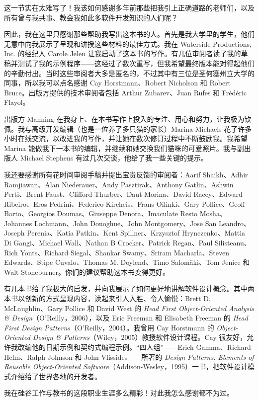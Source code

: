这一节实在太难写了！我该如何感谢多年前那些把我引上正确道路的老师们，以及所有曾与我共事、教会我如此多软件开发知识的人们呢？

因此，我在这里只感谢那些帮助我写出这本书的人。首先是我大学里的学生，他们无意中向我展示了呈现和讲授这些材料的最佳方式。我在 Waterside Productions, Inc. 的经纪人 Carole Jelen 让我启动了这本书的写作。有几位审阅者读了我的草稿并测试了我的示例程序——这经过了数次重写，但我希望最终版本能对得起他们的辛勤付出。当时这些审阅者大多是匿名的，不过其中有三位是圣何塞州立大学的同事，所以我可以点名感谢 Cay Horstmann、Robert Nicholson 和 Robert Bruce。出版方提供的技术审阅者包括 Arthur Zubarev、Juan Rufes 和 Frédéric Flayol。

出版方 Manning 在我身上、在本书写作上投入的专注、用心和努力，让我极为钦佩。我与高级开发编辑（也是一位养了多只猫的家长）Marina Michaels 花了许多小时在线交流，以改进我的写作，并让她在数次修订过程中不断鼓励我。我希望 Marina 能做我下一本书的编辑，并继续和她交换我们猫咪的可爱照片。我与副出版人 Michael Stephens 有过几次交谈，他给了我一些关键的提示。

我还要感谢所有花时间审阅手稿并提出宝贵反馈的审阅者：Aarif Shaikh、Adhir Ramjiawan、Alan Niederauer、Andy Pasztirak、Anthony Gatlin、Ashwin Perti、Brent Faust、Clifford Thurber、Daut Morina、David Racey、Edward Ribeiro、Eros Pedrini、Federico Kircheis、Frans Oilinki、Gary Pollice、Geoff Barto、Georgios Doumas、Giuseppe Denora、Imaculate Resto Mosha、Johannes Lochmann、John Donoghue、John Montgomery、Jose San Leandro、Joseph Perenia、Katia Patkin、Kent Spillner、Krzysztof Hrynczenko、Mattia Di Gangi、Michael Wall、Nathan B Crocker、Patrick Regan、Paul Silisteanu、Rich Yonts、Richard Siegal、Shankar Swamy、Sriram Macharla、Steven Edwards、Stipe Cuvalo、Thomas M. Doylend、Timo Salomäki、Tom Jenice 和 Walt Stoneburner。你们的建议帮助这本书变得更好。

有几本书给了我极大的启发，并向我展示了如何更好地讲解软件设计概念。其中两本书以创新的方式呈现内容，读起来引人入胜、令人愉悦：Brett D. McLaughlin、Gary Pollice 和 David West 的 \emph{Head First Object-Oriented Analysis \& Design}（O'Reilly，2006），以及 Eric Freeman 和 Elisabeth Freeman 的 \emph{Head First Design Patterns}（O'Reilly，2004）。我曾用 Cay Horstmann 的 \emph{Object-Oriented Design \& Patterns}（Wiley，2005）教授软件设计课程。Cay 很友好，允许我改编他的日期示例和契约式编程示例。“四人组”——Erich Gamma、Richard Helm、Ralph Johnson 和 John Vlissides——所著的 \emph{Design Patterns: Elements of Reusable Object-Oriented Software}（Addison-Wesley，1995）一书，把软件设计模式介绍给了世界各地的开发者。

我在硅谷工作与教书的这段职业生涯多么精彩！对此我怎么感谢都不为过。
